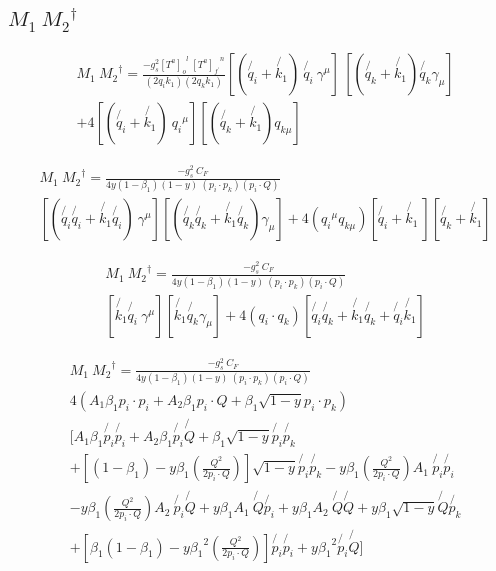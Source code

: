\subsection*{$ M_1\: {M_2}^{\dagger} $}

\begin{equation}
\begin{split}
&M_1\: {M_2}^{\dagger} = \frac{-g_s^2 {[T^a]_o}^l \:{[T^a]_{f^{\prime}}}^n }{(2q_i k_1)(2q_k k_1)} 
[(\not{q_i} + \not{k_1})\:\not{q_i}\: \gamma^{\mu}] \:[(\not{q_k} + \not{k_1}) \not{q_k} \gamma_{\mu}] \\
&+4[(\not{q_i} + \not{k_1})\:{q_{i}}^{\mu}][(\not{q_k} + \not{k_1}) {q_{k{\mu}}}]
\end{split}
\end{equation}

\begin{equation}
\begin{split}
&M_1\: {M_2}^{\dagger} = \frac{-g_s^2\: C_F }{4y(1-\beta_1) (1-y)\:(p_i \cdot p_k)(p_i \cdot Q)} \\
&[(\not{q_i}\not{q_i} + \not{k_1}\not{q_i})\: \gamma^{\mu}] [(\not{q_k}\not{q_k} + \not{k_1}\not{q_k})  \gamma_{\mu}] +4({{q_{i}}^{\mu}q_{k{\mu}}})[\not{q_i} + \not{k_1}\:][\not{q_k} + \not{k_1} ]
\end{split}
\end{equation}

\begin{equation}
\begin{split}
&M_1\: {M_2}^{\dagger} = \frac{-g_s^2\: C_F }{4y(1-\beta_1) (1-y)\:(p_i \cdot p_k)(p_i \cdot Q)} \\
&[\not{k_1}\not{q_i}\: \gamma^{\mu}] [ \not{k_1}\not{q_k}  \gamma_{\mu}] +4({q_{i}}\cdot q_k)[\not{q_i}\not{q_k} + \not{k_1}\not{q_k}+\not{q_i}\not{k_1} ]
\end{split}
\end{equation}

\begin{equation}
\begin{split}
&M_1\: {M_2}^{\dagger} = \frac{-g_s^2\: C_F }{4y(1-\beta_1) (1-y)\:(p_i \cdot p_k)(p_i \cdot Q)} \\
&4(A_1\beta_1 {p_i}\cdot{p_i}+A_2\beta_1 {p_i}\cdot {{Q}}+\beta_1 \sqrt{1-y}{p_i}\cdot {{p_k}})\\
&[A_1\beta_1 \not{p_i}\not{p_i}+A_2\beta_1 \not{p_i}\not{Q}+\beta_1 \sqrt{1-y}\not{p_i} \not{p_k}\\
&+ [(1-\beta_1)-y\beta_1 (\frac{Q^2}{2p_i \cdot Q})] \sqrt{1-y}\not{p_i}\not{p_k}-y {\beta_1} (\frac{Q^2}{2p_i \cdot Q}) A_1 \:\not{p_i}\not{p_i}\\
&-y {\beta_1} (\frac{Q^2}{2p_i \cdot Q}) A_2\: \not{p_i}\not{Q}+y {\beta_1} A_1 \:\not{Q}\not{p_i}+y {\beta_1} A_2 \:\not{Q}\not{Q}+y {\beta_1}\sqrt{1-y}\not{Q}\not{p_k}\\
&+[\beta_1(1-\beta_1)-y {\beta_1}^2 (\frac{Q^2}{2p_i \cdot Q})] \not{p_i}\not{p_i}+y {\beta_1}^2 \not{p_i}\not{Q} ]
\end{split}
\end{equation}


